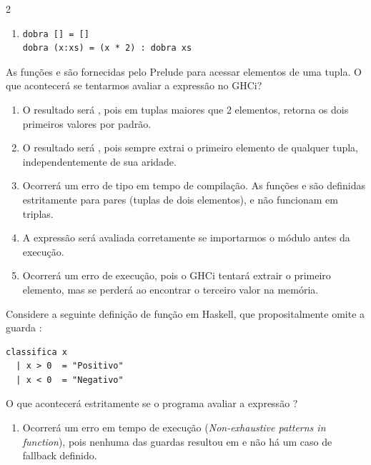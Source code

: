 \documentclass[a4paper,10pt,brazil]{article}
\begin{document}
\begin{multicols}{2}
\begin{enumerate}
  \item \begin{verbatim}
dobra [] = []
dobra (x:xs) = (x * 2) : dobra xs
\end{verbatim}


\end{enumerate}

As funções  e  são fornecidas pelo Prelude para acessar elementos de uma tupla. O que acontecerá se tentarmos avaliar a expressão  no GHCi?

\begin{enumerate}
  \item O resultado será , pois em tuplas maiores que 2 elementos,  retorna os dois primeiros valores por padrão.

  \item O resultado será , pois  sempre extrai o primeiro elemento de qualquer tupla, independentemente de sua aridade.

  \item Ocorrerá um erro de tipo em tempo de compilação. As funções  e  são definidas estritamente para pares (tuplas de dois elementos), e não funcionam em triplas.

  \item A expressão será avaliada corretamente se importarmos o módulo  antes da execução.

  \item Ocorrerá um erro de execução, pois o GHCi tentará extrair o primeiro elemento, mas se perderá ao encontrar o terceiro valor na memória.


\end{enumerate}

Considere a seguinte definição de função em Haskell, que propositalmente omite a guarda :

\begin{verbatim}
classifica x
  | x > 0  = "Positivo"
  | x < 0  = "Negativo"
\end{verbatim}

O que acontecerá estritamente se o programa avaliar a expressão ?

\begin{enumerate}
  \item Ocorrerá um erro em tempo de execução (\emph{Non-exhaustive patterns in function}), pois nenhuma das guardas resultou em  e não há um caso de fallback definido.


\end{enumerate}
\end{multicols}
\end{document}
